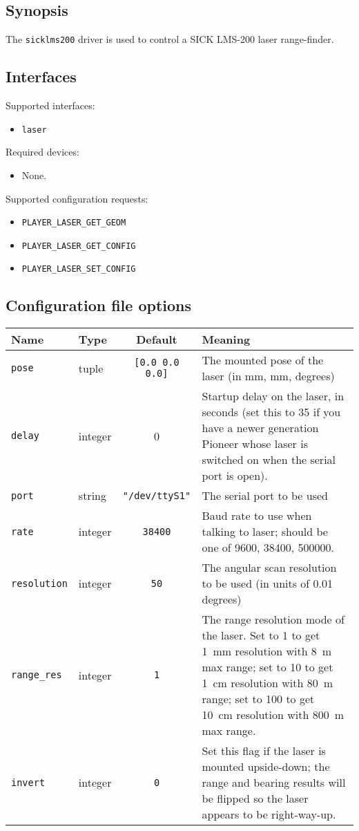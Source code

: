 \subsection*{Synopsis}
The {\tt sicklms200} driver is used to control a SICK LMS-200 laser
range-finder.

\subsection*{Interfaces}

\noindent Supported interfaces:
\begin{itemize}
\item {\tt laser}
\end{itemize}

\noindent Required devices:
\begin{itemize}
\item None.
\end{itemize}

\noindent Supported configuration requests:
\begin{itemize}
\item \verb+PLAYER_LASER_GET_GEOM+
\item \verb+PLAYER_LASER_GET_CONFIG+
\item \verb+PLAYER_LASER_SET_CONFIG+
\end{itemize}


\subsection*{Configuration file options}

\begin{center}
{\small \begin{tabularx}{\columnwidth}{|l|l|c|X|}
\hline
Name & Type & Default & Meaning\\
\hline
{\tt pose} & tuple & {\tt [0.0 0.0 0.0]} & The mounted pose of the laser (in mm,
mm, degrees)\\
{\tt delay} & integer & 0 & Startup delay on the laser, in seconds (set this to 35 if you
have a newer generation Pioneer whose laser is switched on when the serial port is open). \\
{\tt port} & string & {\tt "/dev/ttyS1"} & The serial port to be used\\
{\tt rate} & integer & {\tt 38400} & Baud rate to use when talking to
laser; should be one of 9600, 38400, 500000.\\
{\tt resolution} & integer & {\tt 50} & The angular scan resolution to be used
(in units of 0.01 degrees)\\
{\tt range\_res} & integer & {\tt 1} & The range resolution mode of the laser.  Set to 1 to get
1~mm resolution with 8~m max range; set to 10 to get 1~cm resolution with 80~m range; set to
100 to get 10~cm resolution with 800~m max range.\\
{\tt invert} & integer & {\tt 0} & Set this flag if the laser is mounted upside-down; the range
and bearing results will be flipped so the laser appears to be right-way-up.\\
\hline
\end{tabularx}}
\end{center}

